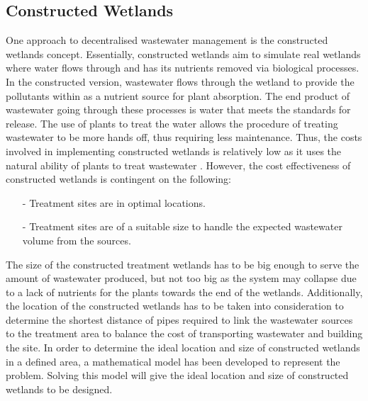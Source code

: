 \documentclass[preprint,12pt,authoryear]{elsarticle}
\begin{document}
\subsection{Constructed Wetlands}
One approach to decentralised wastewater management is the constructed wetlands concept. Essentially, constructed wetlands aim to simulate real wetlands where water flows through and has its nutrients removed via biological processes. In the constructed version, wastewater flows through the wetland to provide the pollutants within as a nutrient source for plant absorption. The end product of wastewater going through these processes is water that meets the standards for release. The use of plants to treat the water allows the procedure of treating wastewater to be more hands off, thus requiring less maintenance. Thus, the costs involved in implementing constructed wetlands is relatively low as it uses the natural ability of plants to treat wastewater \citep{kadlec2009,mawss2015}. However, the cost effectiveness of constructed wetlands is contingent on the following: 
\begin{itemize}
	\setlength{\itemsep}{0pt}
	\setlength{\parskip}{0pt}
	\setlength{\parsep}{0pt}
	\item[-] Treatment sites are in optimal locations. 
	\item[-] Treatment sites are of a suitable size to handle the expected wastewater volume from the sources. 
\end{itemize}
The size of the constructed treatment wetlands has to be big enough to serve the amount of wastewater produced, but not too big as the system may collapse due to a lack of nutrients for the plants towards the end of the wetlands. Additionally, the location of the constructed wetlands has to be taken into consideration to determine the shortest distance of pipes required to link the wastewater sources to the treatment area to balance the cost of transporting wastewater and building the site. \citep{mawss2015} In order to determine the ideal location and size of constructed wetlands in a defined area, a mathematical model has been developed to represent the problem. Solving this model will give the ideal location and size of constructed wetlands to be designed.
\end{document}
